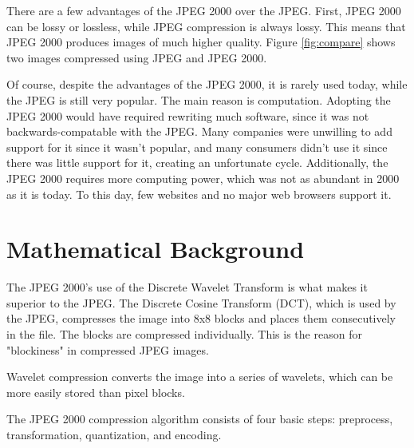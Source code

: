 \documentclass{article}
\begin{document}
There are a few advantages of the JPEG 2000 over the JPEG.
First, JPEG 2000 can be lossy or lossless, while JPEG compression is always lossy.
This means that JPEG 2000 produces images of much higher quality.
Figure \ref{fig:compare} shows two images compressed using JPEG and JPEG 2000.

Of course, despite the advantages of the JPEG 2000, it is rarely used today, 
while the JPEG is still very popular.
The main reason is computation.\cite{alternative} 
Adopting the JPEG 2000 would have required rewriting much software, 
since it was not backwards-compatable with the JPEG.
Many companies were unwilling to add support for it since it wasn't popular,
and many consumers didn't use it since there was little support for it,
creating an unfortunate cycle. 
Additionally, the JPEG 2000 requires more computing power, which was not as abundant in 2000 as it is today.
To this day, few websites and no major web browsers support it.


\section{Mathematical Background}

The JPEG 2000's use of the Discrete Wavelet Transform is what makes it superior to the JPEG.\cite{how}
The Discrete Cosine Transform (DCT), which is used by the JPEG, compresses the image into 8x8 blocks
and places them consecutively in the file.
The blocks are compressed individually.
This is the reason for "blockiness" in compressed JPEG images.

Wavelet compression converts the image into a series of wavelets, which can be more easily stored than pixel blocks.

The JPEG 2000 compression algorithm consists of four basic steps: 
preprocess, transformation, quantization, and encoding\cite{whydomath}.
\end{document}
